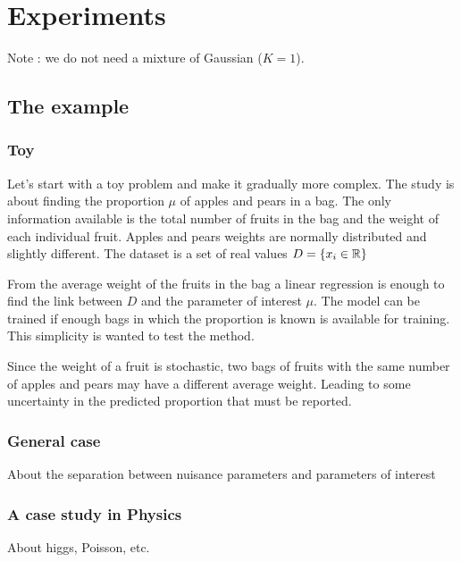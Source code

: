 \section{Experiments}

Note : we do not need a mixture of Gaussian ($K=1$).


\subsection{The example} 

\subsubsection{Toy}

Let's start with a toy problem and make it gradually more complex.
The study is about finding the proportion $\mu$ of apples and pears in a bag.
The only information available is the total number of fruits in the bag and the weight of each individual fruit.
Apples and pears weights are normally distributed and slightly different.
The dataset is a set of real values $D = \{ x_i \in \mathbb{R} \} $

From the average weight of the fruits in the bag a linear regression is enough to find the link between $D$ and the parameter of interest $\mu$.
The model can be trained if enough bags in which the proportion is known is available for training.
This simplicity is wanted to test the method.

Since the weight of a fruit is stochastic, two bags of fruits with the same number of apples and pears may have a different average weight.
Leading to some uncertainty in the predicted proportion that must be reported.




\subsubsection{General case} 

About the separation between nuisance parameters and parameters of interest

\subsubsection{A case study in Physics} 

About higgs, Poisson, etc.


